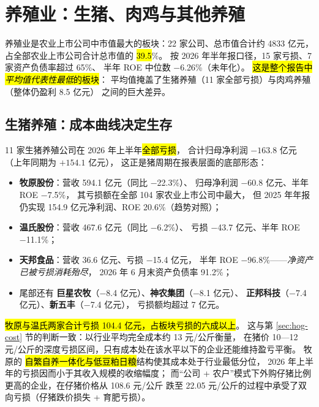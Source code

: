 \section{养殖业：生猪、肉鸡与其他养殖}
\label{sec:breeding}

养殖业是农业上市公司中市值最大的板块：\num{22} 家公司、总市值合计约 \num{4833} 亿元，
占全部农业上市公司合计总市值的 \hl{39.5}\%。
按 2026 年半年报口径，\num{15} 家亏损、\num{7} 家资产负债率超过 \num{65}\%、
半年 ROE 中位数 \num{-6.26}\%（未年化）。
\hl{这是整个报告中\emph{平均值代表性最低}的板块}：
平均值掩盖了生猪养殖（\num{11} 家全部亏损）与肉鸡养殖（整体仍盈利 \num{8.5} 亿元）
之间的巨大差异。



\subsection{生猪养殖：成本曲线决定生存}
\label{sec:breeding-hog}

\num{11} 家生猪养殖公司在 2026 年上半年\hl{全部亏损}，
合计归母净利润 $-163.8$ 亿元（上年同期为 $+154.1$ 亿元），
这正是猪周期在报表层面的底部形态：

\begin{itemize}[leftmargin=1.4em, itemsep=2pt]
  \item \textbf{牧原股份}：营收 \num{594.1} 亿元（同比 \num{-22.3}\%）、
        归母净利润 \num{-60.8} 亿元、半年 ROE \num{-7.5}\%，
        其亏损额在全部 \num{104} 家农业上市公司中最大，
        但 2025 年年报仍实现 \num{154.9} 亿元净利润、ROE \num{20.6}\%（趋势对照）；
  \item \textbf{温氏股份}：营收 \num{467.6} 亿元（同比 \num{-6.2}\%）、
        亏损 \num{-43.7} 亿元、半年 ROE \num{-11.1}\%；
  \item \textbf{天邦食品}：营收 \num{36.6} 亿元、亏损 \num{-15.4} 亿元，
        半年 ROE \num{-96.8}\%——\emph{净资产已被亏损消耗殆尽}，
        2026 年 6 月末资产负债率 \num{91.2}\%；
  \item 尾部还有 \textbf{巨星农牧}（\num{-8.4} 亿元）、\textbf{神农集团}（\num{-8.1} 亿元）、
        \textbf{正邦科技}（\num{-7.4} 亿元）、\textbf{新五丰}（\num{-7.4} 亿元），
        亏损额均超过 \num{7} 亿元。
\end{itemize}

\hl{牧原与温氏两家合计亏损 \num{104.4} 亿元，占板块亏损的六成以上}。
这与第 \ref{sec:hog-cost} 节的判断一致：以行业平均完全成本约 \num{13} 元/公斤衡量，
在猪价 \num{10}---\num{12} 元/公斤的深度亏损区间，只有成本处在该水平以下的企业还能维持盈亏平衡。
牧原的 \hl{自繁自养一体化与低豆粕日粮}结构使其成本处于行业最低分位，
2026 年上半年的亏损因而小于其收入规模的收缩幅度；
而“公司 + 农户”模式下外购仔猪比例更高的企业，在仔猪价格从 \num{108.6} 元/公斤
跌至 \num{22.05} 元/公斤的过程中承受了双向亏损（仔猪跌价损失 + 育肥亏损）。

